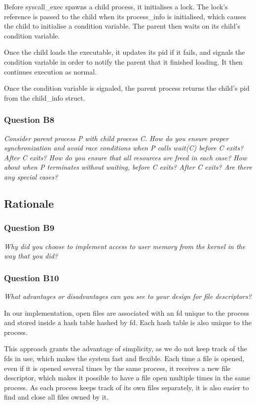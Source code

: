 Before syscall\_exec spawns a child process, it initialises a lock. The lock's reference is passed to the child when its process\_info is initialised, which causes the child to initialise a condition variable. The parent then waits on its child's condition variable.

Once the child loads the executable, it updates its pid if it fails, and signals the condition variable in order to notify the parent that it finished loading. It then continues execution as normal.

Once the condition variable is signaled, the parent process returns the child's pid from the child\_info struct.

\subsubsection*{Question B8} %
\textit{Consider parent process P with child process C.  How do you ensure proper synchronization and avoid race conditions when P calls wait(C) before C exits?  After C exits?  How do you ensure that all resources are freed in each case?  How about when P terminates without waiting, before C exits?  After C exits?  Are there any special cases?}



\subsection{Rationale}

\subsubsection*{Question B9} %
\textit{Why did you choose to implement access to user memory from the kernel in the way that you did?}

\subsubsection*{Question B10} %
\textit{What advantages or disadvantages can you see to your design for file descriptors?}

In our implementation, open files are associated with an fd unique to the process and stored inside a hash table hashed by fd. Each hash table is also unique to the process.

This approach grants the advantage of simplicity, as we do not keep track of the fds in use, which makes the system fast and flexible.
Each time a file is opened, even if it is opened several times by the same process, it receives a new file descriptor, which makes it possible to have a file open multiple times in the same process.
As each process keeps track of its own files separately, it is also easier to find and close all files owned by it.


